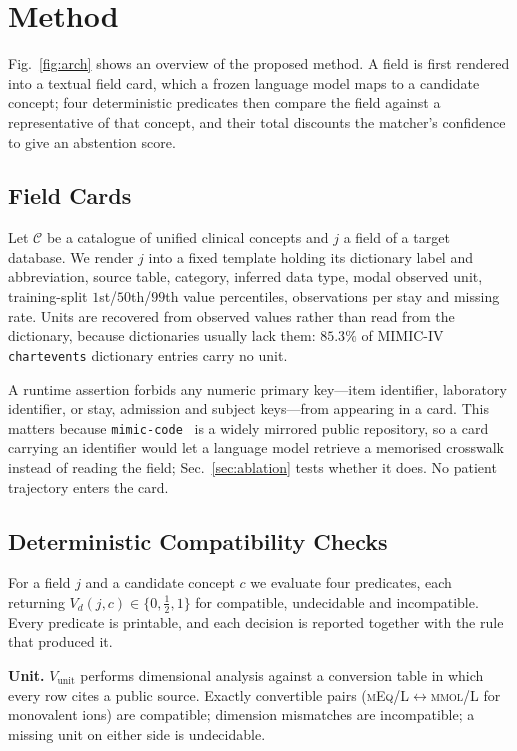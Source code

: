\section{Method}
\label{sec:method}


Fig.~\ref{fig:arch} shows an overview of the proposed method. A field is first rendered
into a textual field card, which a frozen language model maps to a candidate concept;
four deterministic predicates then compare the field against a representative of that
concept, and their total discounts the matcher's confidence to give an abstention score.

\subsection{Field Cards}

Let $\mathcal{C}$ be a catalogue of unified clinical concepts and $j$ a field of a target
database. We render $j$ into a fixed template holding its dictionary label and
abbreviation, source table, category, inferred data type, modal observed unit,
training-split $1$st/$50$th/$99$th value percentiles, observations per stay and missing
rate. Units are recovered from observed values rather than read from the dictionary,
because dictionaries usually lack them: $85.3\%$ of MIMIC-IV \texttt{chartevents}
dictionary entries carry no unit.

A runtime assertion forbids any numeric primary key---item identifier, laboratory
identifier, or stay, admission and subject keys---from appearing in a card. This matters
because \texttt{mimic-code}~\cite{mimiccode} is a widely mirrored public repository, so a
card carrying an identifier would let a language model retrieve a memorised crosswalk
instead of reading the field; Sec.~\ref{sec:ablation} tests whether it does. No patient
trajectory enters the card.

\subsection{Deterministic Compatibility Checks}

For a field $j$ and a candidate concept $c$ we evaluate four predicates, each returning
$V_d(j,c)\in\{0,\tfrac12,1\}$ for compatible, undecidable and incompatible. Every
predicate is printable, and each decision is reported together with the rule that
produced it.

\noindent\textbf{Unit.}
$V_{\mathrm{unit}}$ performs dimensional analysis against a conversion table in which
every row cites a public source. Exactly convertible pairs
(\textsc{mEq/L}$\leftrightarrow$\textsc{mmol/L} for monovalent ions) are compatible;
dimension mismatches are incompatible; a missing unit on either side is undecidable.

